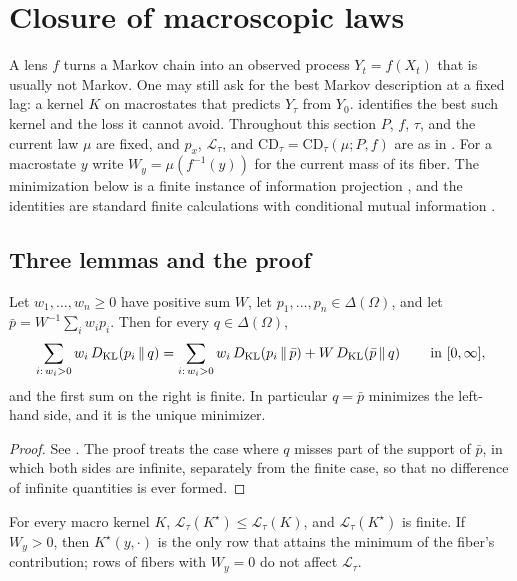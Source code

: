 \section{Closure of macroscopic laws}\label{sec:closure}

A lens $f$ turns a Markov chain into an observed process $Y_t=f(X_t)$ that is usually not Markov.
One may still ask for the best Markov description at a fixed lag: a kernel $K$ on macrostates that predicts $Y_\tau$ from $Y_0$.
\thmNGMacroClosureDeficit{} identifies the best such kernel and the loss it cannot avoid.
Throughout this section $P$, $f$, $\tau$, and the current law $\mu$ are fixed, and $p_x$, $\mathcal{L}_\tau$, and $\mathrm{CD}_\tau=\mathrm{CD}_\tau(\mu;P,f)$ are as in .
For a macrostate $y$ write $W_y=\mu(f^{-1}(y))$ for the current mass of its fiber.
The minimization below is a finite instance of information projection \citep{Csiszar1975}, and the identities are standard finite calculations with conditional mutual information \citep{CoverThomas2006}.

\subsection{Three lemmas and the proof}

\begin{lemma}\label{lem:closure_kl_mixture}
Let $w_1,\dots,w_n\ge 0$ have positive sum $W$, let $p_1,\dots,p_n\in\Delta(\Omega)$, and let $\bar p=W^{-1}\sum_i w_ip_i$. Then for every $q\in\Delta(\Omega)$,
\[
  \sum_{i:\,w_i>0}w_i\,D_{\mathrm{KL}}\!\left(p_i\,\middle\|\,q\right)=\sum_{i:\,w_i>0}w_i\,D_{\mathrm{KL}}\!\left(p_i\,\middle\|\,\bar p\right)+W\,D_{\mathrm{KL}}\!\left(\bar p\,\middle\|\,q\right)\qquad\text{in }[0,\infty],
\]
and the first sum on the right is finite.
In particular $q=\bar p$ minimizes the left-hand side, and it is the unique minimizer.
\end{lemma}

\begin{proof}
See .
The proof treats the case where $q$ misses part of the support of $\bar p$, in which both sides are infinite, separately from the finite case, so that no difference of infinite quantities is ever formed.
\end{proof}

\begin{lemma}\label{lem:closure_best_macro_kernel}
For every macro kernel $K$, $\mathcal{L}_\tau(K^\star)\le\mathcal{L}_\tau(K)$, and $\mathcal{L}_\tau(K^\star)$ is finite.
If $W_y>0$, then $K^\star(y,\cdot)$ is the only row that attains the minimum of the fiber's contribution; rows of fibers with $W_y=0$ do not affect $\mathcal{L}_\tau$.
\end{lemma}


